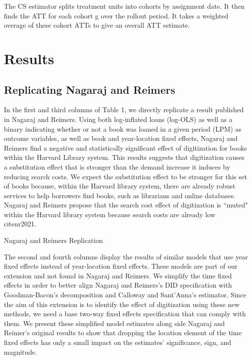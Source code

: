 \documentclass{article}
\begin{document}
The CS estimator splits treatment units into cohorts by assignment date. It then finds the ATT for each cohort g over the rollout period. It takes a weighted overage of these cohort ATTs to give an overall ATT estimate.



\section{Results}
\subsection{Replicating Nagaraj and Reimers}

In the first and third columns of Table 1, we directly replicate a result published in Nagaraj and Reimers. Using both log-inflated loans (log-OLS) as well as a binary indicating whether or not a book was loaned in a given period (LPM) as outcome variables, as well as book and year-location fixed effects, Nagaraj and Reimers find a negative and statistically significant effect of digitization for books within the Harvard Library system. This results suggests that digitization causes a substitution effect that is stronger than the demand increase it induces by reducing search costs. We expect the substitution effect to be stronger for this set of books because, within the Harvard library system, there are already robust services to help borrowers find books, such as librarians and online databases. Nagaraj and Reimers propose that the search cost effect of digitization is ``muted" within the Harvard library system because search costs are already low cite{nr2021}. 

\begin{table}[htbp]
   \centering
   \caption{Nagaraj and Reimers Replication}
  
   \label{tab:booktabs}
\end{table}

The second and fourth columns display the results of similar models that use year fixed effects instead of year-location fixed effects. These models are part of our extension and not found in Nagaraj and Reimers. We simplify the time fixed effects in order to better align Nagaraj and Reimers's DID specification with Goodman-Bacon's decomposition and Calloway and Sant'Anna's estimator. Since the aim of this extension is to identify the effect of digitization using these new methods, we need a base two-way fixed effects specification that can comply with them. We present these simplified model estimates along side Nagaraj and Reimer's original results to show that dropping the location element of the time fixed effects has only a small impact on the estimates' significance, sign, and magnitude.
\end{document}
